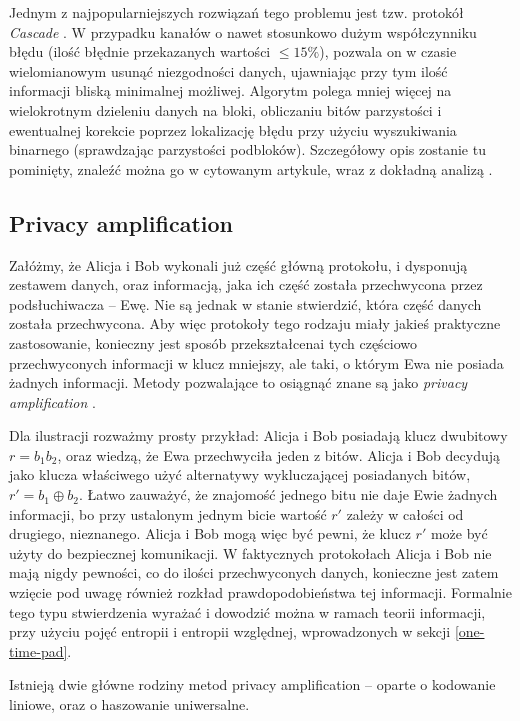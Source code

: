 \documentclass[10pt]{article}
\begin{document}
Jednym z najpopularniejszych rozwiązań tego problemu jest tzw. protokół \emph{Cascade} \cite{Brassard94}.
W przypadku kanałów o nawet stosunkowo dużym współczynniku błędu (ilość błędnie przekazanych wartości
\(\leq 15\%\)), pozwala on w czasie wielomianowym usunąć niezgodności danych, ujawniając przy tym
ilość informacji bliską minimalnej możliwej. Algorytm polega mniej więcej na wielokrotnym dzieleniu 
danych na bloki, obliczaniu bitów parzystości i ewentualnej korekcie poprzez lokalizację błędu przy
użyciu wyszukiwania binarnego (sprawdzając parzystości podbloków). Szczegółowy opis zostanie tu
pominięty, znaleźć można go w cytowanym artykule, wraz z dokładną analizą \cite{Brassard94}.


\subsection{Privacy amplification}

Załóżmy, że Alicja i Bob wykonali już część główną protokołu, i dysponują zestawem danych, oraz
informacją, jaka ich część została przechwycona przez podsłuchiwacza -- Ewę. Nie są jednak w stanie
stwierdzić, która część danych została przechwycona. Aby więc protokoły tego rodzaju miały jakieś
praktyczne zastosowanie, konieczny jest sposób przekształcenai tych częściowo przechwyconych informacji
w klucz mniejszy, ale taki, o którym Ewa nie posiada żadnych informacji. Metody pozwalające to osiągnąć
znane są jako \emph{privacy amplification} \cite{Watanabe07}.

Dla ilustracji rozważmy prosty przykład: Alicja i Bob posiadają klucz dwubitowy \(r = b_1 b_2\), oraz
wiedzą, że Ewa przechwyciła jeden z bitów. Alicja i Bob decydują jako klucza właściwego użyć alternatywy
wykluczającej posiadanych bitów, \(r' = b_1 \oplus b_2\). Łatwo zauważyć, że znajomość jednego bitu
nie daje Ewie żadnych informacji, bo przy ustalonym jednym bicie wartość \(r'\) zależy w całości od 
drugiego, nieznanego. Alicja i Bob mogą więc być pewni, że klucz \(r'\) może być użyty do bezpiecznej
komunikacji. W faktycznych protokołach Alicja i Bob nie mają nigdy pewności, co do ilości przechwyconych 
danych, konieczne jest zatem wzięcie pod uwagę również rozkład prawdopodobieństwa tej informacji. 
Formalnie tego typu stwierdzenia wyrażać i dowodzić można w ramach teorii informacji, przy użyciu pojęć
entropii i entropii względnej, wprowadzonych w sekcji \ref{one-time-pad}.

Istnieją dwie główne rodziny metod privacy amplification -- oparte o kodowanie liniowe, oraz o
haszowanie uniwersalne.
\end{document}
